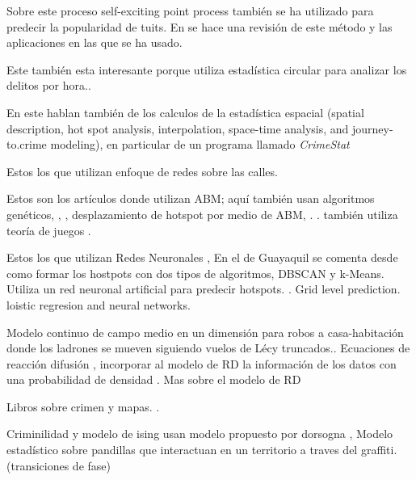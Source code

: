 \documentclass[onecolumn,12pt,letterpaper]{article}
\begin{document}
Sobre este proceso self-exciting point process también se ha utilizado para predecir la popularidad de tuits\cite{zhao2015seismic}. En \cite{reinhart2018review} se hace una revisión de este método y las aplicaciones en las que se ha usado. 

Este también esta interesante porque utiliza estadística circular para analizar los delitos por hora.\cite{brunsdon2006using}.


En este hablan también de los calculos de la estadística espacial (spatial description, hot spot analysis, interpolation, space-time analysis, and journey-to.crime modeling), en particular de un programa llamado \textit{CrimeStat}\cite{levine2006crime}

Estos los que utilizan enfoque de redes sobre las calles\cite{rosser_predictive_2017}. \cite{porta_network_2006} \cite{porta_network_2006-1} \cite{davies_modelling_2013}

Estos son los artículos donde utilizan ABM; aquí también usan algoritmos genéticos\cite{furtado_bio-inspired_2009}, \cite{malleson_agent-based_2009}, \cite{malleson_crime_2010} , desplazamiento de hotspot por medio de ABM\cite{wang_analyzing_2014}, \cite{devia_generating_2013}. \cite{hegemann_geographical_2011}. \cite{groff_simulation_2007} también utiliza teoría de juegos  \cite{bruni_what_2013}.


Estos los que utilizan Redes Neuronales \cite{francisco_alisis_2015}, \cite{olligschlaeger_artificial_1998}
En el de Guayaquil se comenta desde como formar los hostpots con dos tipos de algoritmos, DBSCAN y k-Means. Utiliza un red neuronal artificial para predecir hotspots.\cite{garcia-plua_deteccion_2017} \cite{zhuang_crime_2017}. Grid level prediction. loistic regresion and neural networks. \cite{rummens_use_2017}

Modelo continuo de campo medio en un dimensión para robos a casa-habitación donde los ladrones se mueven siguiendo vuelos de Lécy truncados.\cite{pan_crime_2018}. Ecuaciones de reacción difusión \cite{short_dissipation_2010}, incorporar al modelo de RD la información de los datos con una probabilidad de densidad \cite{woodworth_j._t._non-local_2014}. Mas sobre el modelo de RD \cite{short_nonlinear_2010}


Libros sobre crimen y mapas. \cite{rossmo_geographic_2014} \cite{santos_crime_2016} \cite{liu_artificial_2008} \cite{weisburd_crime_1998} \cite{chainey_crime_2008}. 


Criminilidad y modelo de ising usan modelo propuesto por dorsogna \cite{ayouche_second_2015}, 
Modelo estadístico sobre pandillas que interactuan en un territorio a traves del graffiti.(transiciones de fase)\cite{barbaro_territorial_2013}
\end{document}
